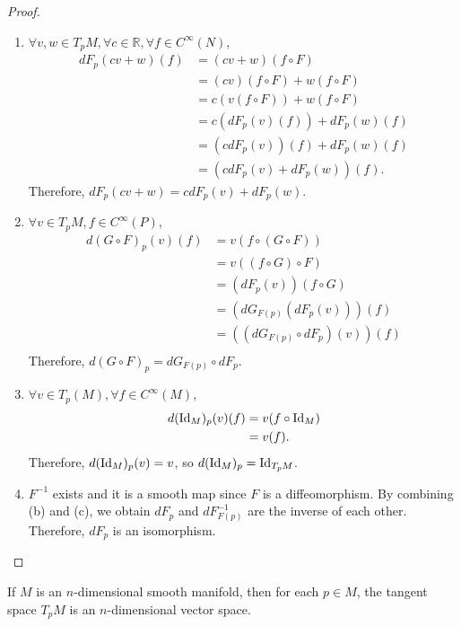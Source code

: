 \begin{proof}
  \begin{enumerate}[label=(\alph*)]
    \item
      $\forall v, w \in T_pM, \forall c \in \mathbb{R}, \forall f \in C^{\infty}(N)$,
      \begin{align*}
        dF_p(cv + w)(f)
          &= (cv + w)(f \circ F) \\
          &= (cv)(f \circ F) + w(f \circ F) \\
          &= c(v(f \circ F)) + w(f \circ F) \\
          &= c(dF_p(v)(f)) + dF_p(w)(f) \\
          &= (cdF_p(v))(f) + dF_p(w)(f) \\
          &= (cdF_p(v) + dF_p(w))(f).
      \end{align*}
      Therefore, $dF_p(cv + w) = cdF_p(v) + dF_p(w)$.
    \item
      $\forall v \in T_pM, f \in C^{\infty}(P)$,
      \begin{align*}
        d(G \circ F)_p(v)(f)
          &= v(f \circ (G \circ F)) \\
          &= v((f \circ G) \circ F) \\
          &= (dF_p(v))(f \circ G) \\
          &= (dG_{F(p)}(dF_p(v)))(f) \\
          &= ((dG_{F(p)} \circ dF_p)(v))(f) \\
      \end{align*}
      Therefore, $d(G \circ F)_p = dG_{F(p)} \circ dF_p$.
    \item
      $\forall v \in T_p(M), \forall f \in C^{\infty}(M)$,
      \begin{align*}
        d(\operatorname{Id}_M)_p(v)(f)
          &= v(f \circ \operatorname{Id}_M) \\
          &= v(f).
      \end{align*}
      Therefore, $d(\operatorname{Id}_M)_p(v) = v$, so $d(\operatorname{Id}_M)_p = \operatorname{Id}_{T_pM}$.
    \item
      $F^{-1}$ exists and it is a smooth map since $F$ is a diffeomorphism.
      By combining (b) and (c), we obtain $dF_p$ and $dF^{-1}_{F(p)}$ are the inverse of each other.
      Therefore, $dF_p$ is an isomorphism.
  \end{enumerate}
\end{proof}

\begin{customthm}{3.10}
  If $M$ is an $n$-dimensional smooth manifold, then for each $p \in M$, the tangent space $T_pM$ is an $n$-dimensional vector space.
\end{customthm}

